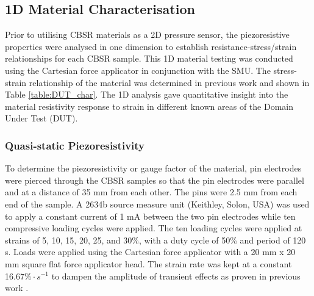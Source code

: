 

\subsection{1D Material Characterisation} \label{sec:1D Material Characterisation}
Prior to utilising CBSR materials as a 2D pressure sensor, the piezoresistive properties were analysed in one dimension to establish resistance-stress/strain relationships for each CBSR sample. This 1D material testing was conducted using the Cartesian force applicator in conjunction with the SMU. The stress-strain relationship of the material was determined in previous work and shown in Table \ref{table:DUT_char}. The 1D analysis gave quantitative insight into the material resistivity response to strain in different known areas of the Domain Under Test (DUT). 

\subsubsection{Quasi-static Piezoresistivity}\label{sec:Quasi-static Piezoresistivity}
 To determine the piezoresistivity or gauge factor of the material, pin electrodes were pierced through the CBSR samples so that the pin electrodes were parallel and at a distance of 35 mm from each other. The pins were 2.5 mm from each end of the sample. A 2634b source measure unit (Keithley, Solon, USA) was used to apply a constant current of 1 mA between the two pin electrodes while ten compressive loading cycles were applied. The ten loading cycles were applied at strains of 5, 10, 15, 20, 25, and 30\%, with a duty cycle of 50\% and period of 120 s. Loads were applied using the Cartesian force applicator with a 20 mm x 20 mm square flat force applicator head. The strain rate was kept at a constant 16.67$\% \cdot s^{-1}$ to dampen the amplitude of transient effects as proven in previous work \citep{Ellingham2021}.

